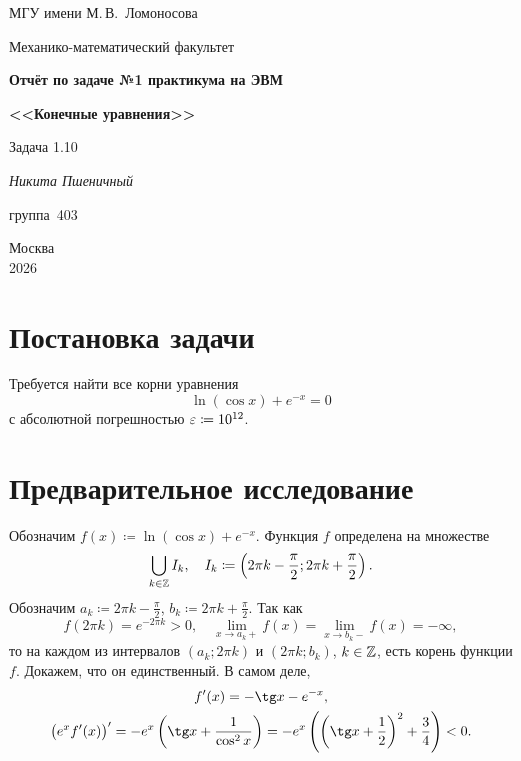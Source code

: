 \documentclass[a5paper, leqno, 10pt]{article}
\begin{document}

\begin{titlepage}
	\thispagestyle{empty}
    \begin{center}
        МГУ имени М.\,В.~Ломоносова\par\medskip Механико-математический факультет

        \vfill

        {\Large \textbf{Отчёт по задаче №1 практикума на ЭВМ}\par \textbf{<<Конечные уравнения>>}}

		\bigskip

		Задача 1{.}10

        \vfill

        \begin{flushright}
            \textit{Никита Пшеничный}\par группа~403
        \end{flushright}

        \bigskip

        Москва\\
        2026
    \end{center}
\end{titlepage}

\restoregeometry

\section{Постановка задачи}

Требуется найти все корни уравнения
\[
	\ln(\cos x) + e^{-x} = 0
\]
с абсолютной погрешностью $\varepsilon \coloneqq 10^{12}$.

\section{Предварительное исследование}

Обозначим $f(x) \coloneqq \ln(\cos x) + e^{-x}$. Функция $f$ определена на множестве
\[
	\bigcup_{k \in \mathbb{Z}}I_k,\quad I_k \coloneqq \left(2\pi k - \frac{\pi}{2}; 2\pi k + \frac{\pi}{2}\right).
\]
Обозначим $a_k \coloneqq 2\pi k - \frac{\pi}{2}$, $b_k \coloneqq 2\pi k + \frac{\pi}{2}$. Так как
\[
	f(2\pi k) = e^{-2\pi k} > 0,\quad \lim_{x \to a_k +}f(x) = \lim_{x \to b_k -}f(x) = -\infty,
\]
то на каждом из интервалов $(a_k; 2\pi k)$ и $(2\pi k; b_k)$, $k \in \mathbb{Z}$, есть корень функции $f$. Докажем, что он единственный. В самом деле,
\begin{gather*}
	f^{\prime}(x) = -\tg x - e^{-x},\\
	\big(e^xf^{\prime}(x)\big)^{\prime} = -e^x\left(\tg x + \frac{1}{\cos^2x}\right) = -e^x\left(\left(\tg x + \frac{1}{2}\right)^2 + \frac{3}{4}\right) < 0.
\end{gather*}
\end{document}
